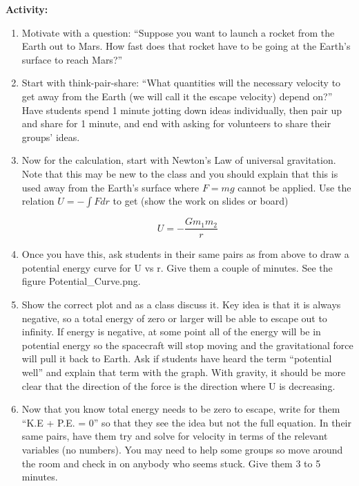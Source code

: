 \documentclass{article}
\begin{document}
\textbf{Activity:}
\begin{enumerate}
\item Motivate with a question: ``Suppose you want to launch a rocket from the Earth out to Mars. How fast does that rocket have to be going at the Earth's surface to reach Mars?''

\item Start with think-pair-share: ``What quantities will the necessary velocity to get away from the Earth (we will call it the escape velocity) depend on?'' Have students spend 1 minute jotting down ideas individually, then pair up and share for 1 minute, and end with asking for volunteers to share their groups' ideas.

\item Now for the calculation, start with Newton's Law of universal gravitation. Note that this may be new to the class and you should explain that this is used away from the Earth's surface where $F = mg$ cannot be applied. Use the relation $U = - \int F dr$ to get (show the work on slides or board) 

\begin{equation}
U = - \frac{G m_1 m_2}{r}
\end{equation}

\item Once you have this, ask students in their same pairs as from above to draw a potential energy curve for U vs r. Give them a couple of minutes. See the figure Potential\_Curve.png.

\item Show the correct plot and as a class discuss it. Key idea is that it is always negative, so a total energy of zero or larger will be able to escape out to infinity. If energy is negative, at some point all of the energy will be in potential energy so the spacecraft will stop moving and the gravitational force will pull it back to Earth. Ask if students have heard the term ``potential well'' and explain that term with the graph. With gravity, it should be more clear that the direction of the force is the direction where U is decreasing.

\item Now that you know total energy needs to be zero to escape, write for them ``K.E + P.E. = 0'' so that they see the idea but not the full equation. In their same pairs, have them try and solve for velocity in terms of the relevant variables (no numbers). You may need to help some groups so move around the room and check in on anybody who seems stuck. Give them 3 to 5 minutes.


\end{enumerate}
\end{document}
